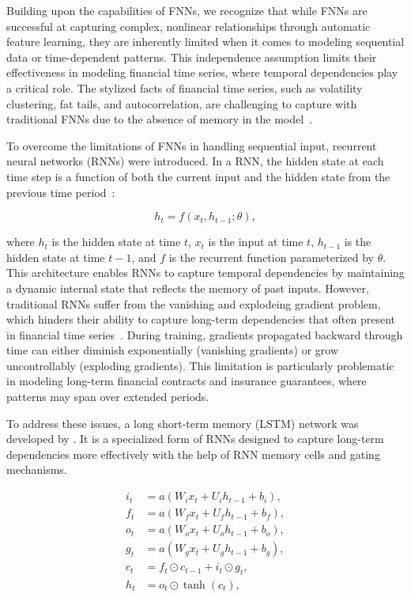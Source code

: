 Building upon the capabilities of FNNs, we recognize that while FNNs are successful at capturing complex, nonlinear relationships through automatic feature learning, they are inherently limited when it comes to modeling sequential data or time-dependent patterns. 
This independence assumption limits their effectiveness in modeling financial time series, where temporal dependencies play a critical role. 
The stylized facts of financial time series, such as volatility clustering, fat tails, and autocorrelation, are challenging to capture with traditional FNNs due to the absence of memory in the model~\citep{cont2001empirical}.

To overcome the limitations of FNNs in handling sequential input, recurrent neural networks (RNNs) were introduced.
In a RNN, the hidden state at each time step is a function of both the current input and the hidden state from the previous time period~\citep{elman1990finding}:

\begin{equation}
    h_t = f(x_t, h_{t-1}; \theta),
\end{equation}

where $h_t$ is the hidden state at time $t$, $x_t$ is the input at time $t$, $h_{t-1}$ is the hidden state at time $t-1$, and $f$ is the recurrent function parameterized by $\theta$.
This architecture enables RNNs to capture temporal dependencies by maintaining a dynamic internal state that reflects the memory of past inputs.
However, traditional RNNs suffer from the vanishing and explodeing gradient problem, which hinders their ability to capture long-term dependencies that often present in financial time series~\citep{bengio1994learning}.
During training, gradients propagated backward through time can either diminish exponentially (vanishing gradients) or grow uncontrollably (exploding gradients).
This limitation is particularly problematic in modeling long-term financial contracts and insurance guarantees, where patterns may span over extended periods.

To address these issues, a long short-term memory (LSTM) network was developed by \citet{hochreiter1997long}.
It is a specialized form of RNNs designed to capture long-term dependencies more effectively with the help of RNN memory cells and gating mechanisms.

\begin{align*}
    i_t &= a(W_i x_t + U_i h_{t-1} + b_i), \\
    f_t &= a(W_f x_t + U_f h_{t-1} + b_f), \\
    o_t &= a(W_o x_t + U_o h_{t-1} + b_o), \\
    g_t &= a(W_g x_t + U_g h_{t-1} + b_g), \\
    c_t &= f_t \odot c_{t-1} + i_t \odot g_t, \\
    h_t &= o_t \odot \tanh(c_t),
\end{align*}

